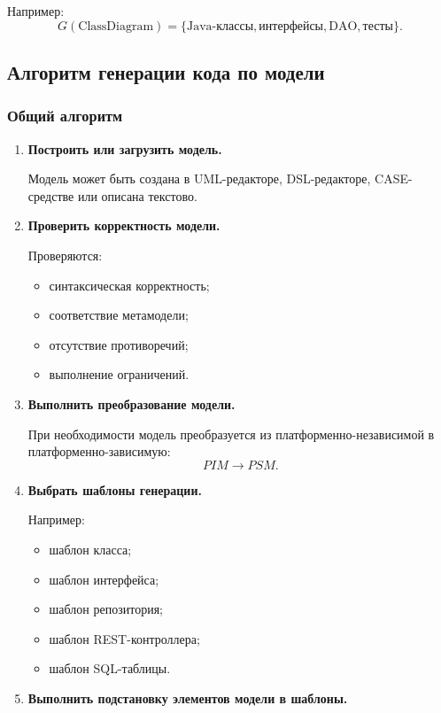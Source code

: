 \documentclass[12pt,a4paper]{article}
\begin{document}
Например:
\[
    G(\text{ClassDiagram}) = \{\text{Java-классы}, \text{интерфейсы}, \text{DAO}, \text{тесты}\}.
\]

\subsection{Алгоритм генерации кода по модели}

\subsubsection{Общий алгоритм}

\begin{enumerate}
    \item \textbf{Построить или загрузить модель.}

    Модель может быть создана в UML-редакторе, DSL-редакторе, CASE-средстве или описана текстово.

    \item \textbf{Проверить корректность модели.}

    Проверяются:
    \begin{itemize}
        \item синтаксическая корректность;
        \item соответствие метамодели;
        \item отсутствие противоречий;
        \item выполнение ограничений.
    \end{itemize}

    \item \textbf{Выполнить преобразование модели.}

    При необходимости модель преобразуется из платформенно-независимой в платформенно-зависимую:
    \[
        PIM \rightarrow PSM.
    \]

    \item \textbf{Выбрать шаблоны генерации.}

    Например:
    \begin{itemize}
        \item шаблон класса;
        \item шаблон интерфейса;
        \item шаблон репозитория;
        \item шаблон REST-контроллера;
        \item шаблон SQL-таблицы.
    \end{itemize}

    \item \textbf{Выполнить подстановку элементов модели в шаблоны.}


\end{enumerate}
\end{document}
